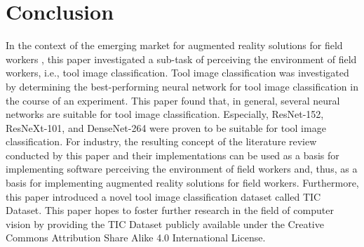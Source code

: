\chapter{Conclusion}
\label{chp:conclusion}
In the context of the emerging market for augmented reality solutions for field workers \autocites{EY.2019a}{EY.2019b}{Detzel.2018}{Shook.2019}{Guy.2019}, this paper investigated a sub-task of perceiving the environment of field workers, i.e., tool image classification. Tool image classification was investigated by determining the best-performing neural network for tool image classification in the course of an experiment. This paper found that, in general, several neural networks are suitable for tool image classification. Especially, ResNet-152, ResNeXt-101, and DenseNet-264 were proven to be suitable for tool image classification. 
%
For industry, the resulting concept of the literature review conducted by this paper and their implementations can be used as a basis for implementing software perceiving the environment of field workers and, thus, as a basis for implementing augmented reality solutions for field workers.
%
Furthermore, this paper introduced a novel tool image classification dataset called \ac{TIC Dataset}. This paper hopes to foster further research in the field of computer vision by providing the \ac{TIC Dataset} publicly available under the Creative Commons Attribution Share Alike 4.0 International License.


